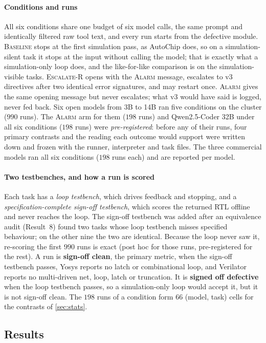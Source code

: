 \documentclass[11pt]{article}
\newcommand{\cname}[1]{\textsc{#1}}
\newcommand{\Base}{\cname{Baseline}}
\newcommand{\Alarm}{\cname{Alarm}}
\newcommand{\EscR}{\cname{Escalate-R}}
\begin{document}
\paragraph{Conditions and runs} All six conditions share one budget of six model
calls, the same prompt and identically filtered raw tool text, and every run
starts from the defective module. \Base{} stops at the first simulation pass, as
AutoChip does, so on a simulation-silent task it stops at the input without
calling the model; that is exactly what a simulation-only loop does, and the
like-for-like comparison is on the simulation-visible tasks. \EscR{} opens with
the \Alarm{} message, escalates to v3 directives after two identical error
signatures, and may restart once. \Alarm{} gives the same opening message but
never escalates; what v3 would have said is logged, never fed back. Six open
models from 3B to 14B ran five conditions on the cluster ($990$ runs). The
\Alarm{} arm for them ($198$ runs) and Qwen2.5-Coder 32B under all six
conditions ($198$ runs) were \emph{pre-registered}: before any of their runs,
four primary contrasts and the reading each outcome would support were written
down and frozen with the runner, interpreter and task files. The three
commercial models ran all six conditions ($198$ runs each) and are reported per
model.

\paragraph{Two testbenches, and how a run is scored} Each task has a \emph{loop
testbench}, which drives feedback and stopping, and a
\emph{specification-complete sign-off testbench}, which scores the returned RTL
offline and never reaches the loop. The sign-off testbench was added after an
equivalence audit (Result~8) found two tasks whose loop testbench misses
specified behaviour; on the other nine the two are identical. Because the loop
never saw it, re-scoring the first $990$ runs is exact (post hoc for those runs,
pre-registered for the rest). A run is \textbf{sign-off clean}, the primary
metric, when the sign-off testbench passes, Yosys reports no latch or
combinational loop, and Verilator reports no multi-driven net, loop, latch or
truncation. It is \textbf{signed off defective} when the loop testbench passes,
so a simulation-only loop would accept it, but it is not sign-off clean. The
$198$ runs of a condition form $66$ (model, task) cells for the contrasts of
\cref{sec:stats}.

\subsection{Results}
\label{sec:mpsoc-results}
\end{document}
